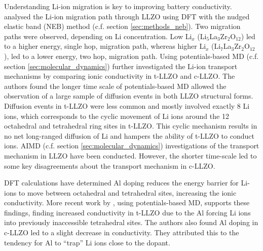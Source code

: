 \documentclass[../main.tex]{subfiles}
\begin{document}
Understanding Li-ion migration is key to improving battery conductivity. \citeauthor{Xu2012} analysed the Li-ion migration path through LLZO using DFT with the nudged elastic band (NEB) method (c.f. section \ref{sec:methods_neb}).\cite{Xu2012} Two migration paths were observed, depending on Li concentration. Low Li$_x$ (Li$_5$La$_3$Zr$_2$O$_{12}$) led to a higher energy, single hop, migration path, whereas higher Li$_x$ (Li$_7$La$_3$Zr$_2$O$_{12}$), led to a lower energy, two hop, migration path. Using potentials-based MD (c.f. section \ref{sec:molecular_dynamics}) \citeauthor{Burbano2016} further investigated the Li-ion transport mechanisms by comparing ionic conductivity in t-LLZO and c-LLZO.\cite{Burbano2016} The authors found the longer time scale of potentials-based MD allowed the observation of a large sample of diffusion events in both LLZO structural forms. Diffusion events in t-LLZO were less common and mostly involved exactly 8 Li ions, which corresponds to the cyclic movement of Li ions around the 12 octahedral and tetrahedral ring sites in t-LLZO. This cyclic mechanism results in no net long-ranged diffusion of Li and hampers the ability of t-LLZO to conduct ions. AIMD (c.f. section \ref{sec:molecular_dynamics}) investigations of the transport mechanism in LLZO have been conducted. However, the shorter time-scale led to some key disagreements about the transport mechanism in c-LLZO.\cite{Meier2014, Jalem2013, Burbano2016}

DFT calculations have determined Al doping reduces the energy barrier for Li-ions to move between octahedral and tetrahedral sites, increasing the ionic conductivity.\cite{Rettenwander2014, Rettenwander2016} More recent work by  \citeauthor{Bonilla2019}, using potentials-based MD, supports these findings, finding increased conductivity in t-LLZO due to the Al forcing Li ions into previously inaccessible tetrahedral sites.\cite{Bonilla2019} The authors also found Al doping in c-LLZO led to a slight decrease in conductivity. They attributed this to the tendency for Al to ``trap'' Li ions close to the dopant.
\end{document}
